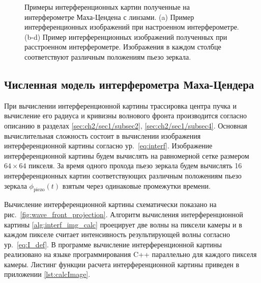 \begin{figure}[ht]
\caption{Примеры интерференционных картин полученные на интерферометре Маха-Цендена с линзами. (a) Пример интерференционных изображений при настроенном интерферометре. (b-d) Пример интерференционных изображений полученных при расстроенном интерферометре. Изображения в каждом столбце соответствуют различным положениям пьезо зеркала.}
\label{fig:visib_lens_expl}
\end{figure}

\subsection{Численная модель интерферометра Маха-Цендера}\label{sec:ch2/sec1/subsec6}

При вычислении интерференционной картины трассировка центра пучка и вычисление его радиуса и кривизны волнового фронта производится согласно описанию в разделах \ref{sec:ch2/sec1/subsec2}, \ref{sec:ch2/sec1/subsec4}. Основная вычислительная сложность состоит в вычислении изображения интерференционной картины согласно ур.~\eqref{eq:interf}. Изображение интерференционной картины будем вычислять на равномерной сетке размером $64\times64$ пикселя. За время одного прохода пьезо зеркала будем вычислять 16 интерференционных картин соответствующих различным положениям пьезо зеркала $\phi_{\mathrm{piezo}}(t)$ взятым через одинаковые промежутки времени. 

Вычисление интерференционной картины схематически показано на рис.~\ref{fig:wave_front_projection}. Алгоритм вычисления интерференционной картины \ref{alg:interf_img_calc} проецирует две волны на пиксели камеры и в каждом пикселе считает интенсивность результирующей волны согласно ур.~\eqref{eq:I_def}. В программе вычисление интерференционной картины реализовано на языке программирования C++ параллельно для каждого пикселя камеры. Листинг функции расчета интерференционной картины приведен в приложении \ref{lst:calcImage}. 

